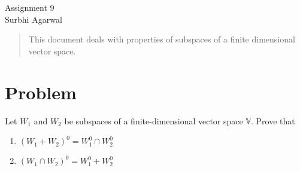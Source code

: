 \documentclass[journal,12pt]{IEEEtran}
\begin{document}
\let\StandardTheFigure\thefigure
\let\vec\mathbf

\renewcommand{\thefigure}{\theproblem}

\def\putbox#1#2#3{\makebox[0in][l]{\makebox[#1][l]{}\raisebox{\baselineskip}[0in][0in]{\raisebox{#2}[0in][0in]{#3}}}}
     \def\rightbox#1{\makebox[0in][r]{#1}}
     \def\centbox#1{\makebox[0in]{#1}}
     \def\topbox#1{\raisebox{-\baselineskip}[0in][0in]{#1}}
     \def\midbox#1{\raisebox{-0.5\baselineskip}[0in][0in]{#1}}
\vspace{3cm}
\begin{center}
\huge Assignment 9\\
\large Surbhi Agarwal\\
\end{center}
\renewcommand{\thefigure}{\theenumi}
\renewcommand{\thetable}{\theenumi}

\begin{abstract}
This document deals with properties of subspaces of a finite dimensional vector space.
\end{abstract}

\section{Problem}
Let $W_1$ and $W_2$ be subspaces of a finite-dimensional vector space $\mathbb V$. Prove that
\begin{enumerate}
    \item $(W_1 + W_2)^0 = W_1^0 \cap W_2^0$
    \item $(W_1 \cap W_2)^0 = W_1^0 + W_2^0$
\end{enumerate}
\end{document}
